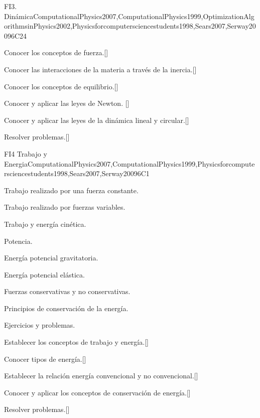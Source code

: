 \begin{syllabus}
\begin{unit}{}{FI3. Dinámica}{ComputationalPhysics2007,ComputationalPhysics1999,OptimizationAlgorithmsinPhysics2002,Physicsforcomputersciencestudents1998,Sears2007,Serway2009}{6}{C24}
   \begin{learningoutcomes}
      \item Conocer los conceptos de fuerza.[\Usage]
      \item Conocer las interacciones de la materia a través de la inercia.[\Usage]
      \item Conocer los conceptos de equilibrio.[\Usage]
      \item Conocer y aplicar las leyes de Newton. [\Usage]   
      \item Conocer y aplicar las leyes de la dinámica lineal y circular.[\Usage]
      \item Resolver problemas.[\Usage]
   \end{learningoutcomes}
\end{unit}

\begin{unit}{}{FI4 Trabajo y Energia}{ComputationalPhysics2007,ComputationalPhysics1999,Physicsforcomputersciencestudents1998,Sears2007,Serway2009}{6}{C1}
\begin{topics}
      \item Trabajo realizado por una fuerza constante.
      \item Trabajo realizado por fuerzas variables.
      \item Trabajo y energía cinética.
      \item Potencia.
      \item Energía potencial gravitatoria.
      \item Energía potencial elástica.
      \item Fuerzas conservativas y no conservativas.
      \item Principios de conservación de la energía.
      \item Ejercicios y problemas.
   \end{topics}

   \begin{learningoutcomes}
      \item Establecer los conceptos de trabajo y energía.[\Usage]
      \item Conocer tipos de energía.[\Usage]
      \item Establecer la relación energía convencional y no convencional.[\Usage]
      \item Conocer y aplicar los conceptos de conservación de energía.[\Usage]
      \item Resolver problemas.[\Usage]
   \end{learningoutcomes}
\end{unit}


\end{syllabus}

